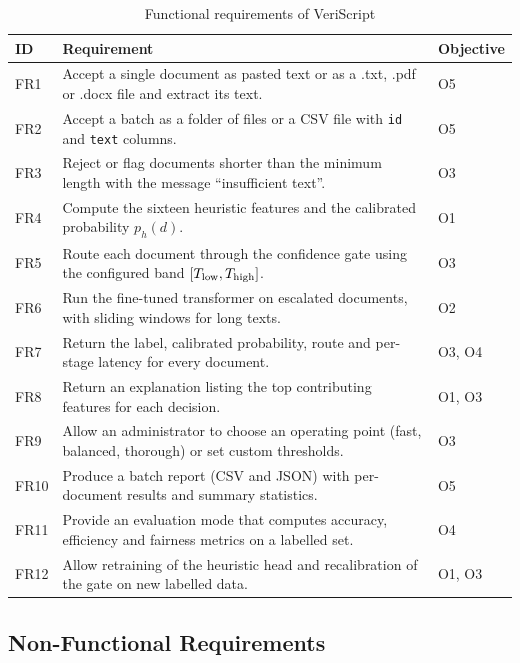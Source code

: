 \begin{table}[H]
\caption{Functional requirements of VeriScript}
\label{tab:fr}
\centering
\small
\begin{tabularx}{\textwidth}{|p{1.0cm}|L|p{1.5cm}|}
\hline
\textbf{ID} & \textbf{Requirement} & \textbf{Objective} \\ \hline
FR1 & Accept a single document as pasted text or as a .txt, .pdf or .docx file and extract its text. & O5 \\ \hline
FR2 & Accept a batch as a folder of files or a CSV file with \texttt{id} and \texttt{text} columns. & O5 \\ \hline
FR3 & Reject or flag documents shorter than the minimum length with the message ``insufficient text''. & O3 \\ \hline
FR4 & Compute the sixteen heuristic features and the calibrated probability $p_h(d)$. & O1 \\ \hline
FR5 & Route each document through the confidence gate using the configured band $[T_{\mathrm{low}},T_{\mathrm{high}}]$. & O3 \\ \hline
FR6 & Run the fine-tuned transformer on escalated documents, with sliding windows for long texts. & O2 \\ \hline
FR7 & Return the label, calibrated probability, route and per-stage latency for every document. & O3, O4 \\ \hline
FR8 & Return an explanation listing the top contributing features for each decision. & O1, O3 \\ \hline
FR9 & Allow an administrator to choose an operating point (fast, balanced, thorough) or set custom thresholds. & O3 \\ \hline
FR10 & Produce a batch report (CSV and JSON) with per-document results and summary statistics. & O5 \\ \hline
FR11 & Provide an evaluation mode that computes accuracy, efficiency and fairness metrics on a labelled set. & O4 \\ \hline
FR12 & Allow retraining of the heuristic head and recalibration of the gate on new labelled data. & O1, O3 \\ \hline
\end{tabularx}
\end{table}

\subsection{Non-Functional Requirements}


